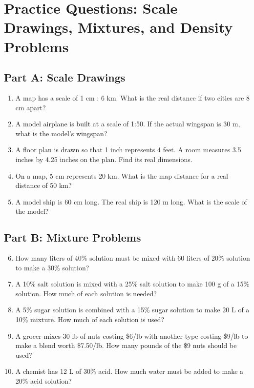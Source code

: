 \documentclass[12pt]{article}
\begin{document}
\newpage


\section*{Practice Questions: Scale Drawings, Mixtures, and Density Problems}

\subsection*{Part A: Scale Drawings}
\begin{enumerate}
  \item A map has a scale of 1 cm : 6 km. What is the real distance if two cities are 8 cm apart?
  \item A model airplane is built at a scale of 1:50. If the actual wingspan is 30 m, what is the model’s wingspan?
  \item A floor plan is drawn so that 1 inch represents 4 feet. A room measures 3.5 inches by 4.25 inches on the plan. Find its real dimensions.
  \item On a map, 5 cm represents 20 km. What is the map distance for a real distance of 50 km?
  \item A model ship is 60 cm long. The real ship is 120 m long. What is the scale of the model?
\end{enumerate}

\subsection*{Part B: Mixture Problems}
\begin{enumerate}
  \setcounter{enumi}{5}
  \item How many liters of 40\% solution must be mixed with 60 liters of 20\% solution to make a 30\% solution?
  \item A 10\% salt solution is mixed with a 25\% salt solution to make 100 g of a 15\% solution. How much of each solution is needed?
  \item A 5\% sugar solution is combined with a 15\% sugar solution to make 20 L of a 10\% mixture. How much of each solution is used?
  \item A grocer mixes 30 lb of nuts costing \$6/lb with another type costing \$9/lb to make a blend worth \$7.50/lb. How many pounds of the \$9 nuts should be used?
  \item A chemist has 12 L of 30\% acid. How much water must be added to make a 20\% acid solution?
\end{enumerate}
\end{document}
